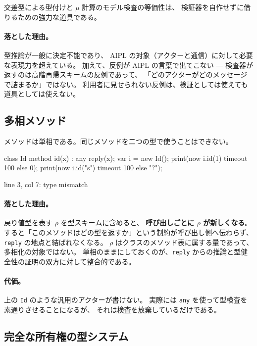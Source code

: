 \documentclass[11pt,a4paper]{ltjsarticle}
\theoremstyle{definition}
\theoremstyle{remark}
\begin{document}
交差型による型付けと $\mu$ 計算のモデル検査の等価性は、
検証器を自作せずに借りるための強力な道具である。

\paragraph{落とした理由。}
型推論が一般に決定不能であり、
AIPL の対象（アクターと通信）に対して必要な表現力を超えている。
加えて、反例が AIPL の言葉で出てこない ---
検査器が返すのは高階再帰スキームの反例であって、
「どのアクターがどのメッセージで詰まるか」ではない。
利用者に見せられない反例は、検証としては使えても道具としては使えない。

\subsection{多相メソッド}

メソッドは単相である。同じメソッドを二つの型で使うことはできない。

\begin{aipl}
class Id { method id(x) : any { reply(x); } }
var i = new Id();
print(now i.id(1) timeout 100 else 0);
print(now i.id("s") timeout 100 else "?");
\end{aipl}
\begin{term}
 line 3, col 7: type mismatch
\end{term}

\paragraph{落とした理由。}
戻り値型を表す $\rho$ を型スキームに含めると、
\textbf{呼び出しごとに $\rho$ が新しくなる}。
すると「このメソッドはどの型を返すか」という制約が呼び出し側へ伝わらず、
\texttt{reply} の地点と結ばれなくなる。
$\rho$ はクラスのメソッド表に属する量であって、多相化の対象ではない。
単相のままにしておくのが、\texttt{reply} からの推論と型健全性の証明の双方に対して整合的である。

\paragraph{代価。}
上の \texttt{Id} のような汎用のアクターが書けない。
実際には \texttt{any} を使って型検査を素通りさせることになるが、
それは検査を放棄しているだけである。

\subsection{完全な所有権の型システム}
\end{document}
